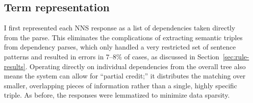 \subsection{Term representation}
\label{sec:response-rep}

I first represented each NNS response as a list of dependencies taken directly from the parse. 
This eliminates the complications of extracting semantic triples from
dependency parses, which only handled a very restricted set of
sentence patterns and resulted in errors in 7--8\% of cases, as discussed in Section~\ref{sec:rule-results}.
Operating directly on individual dependencies from the overall tree also means the system can allow for ``partial credit;'' it distributes the matching over smaller,
overlapping pieces of information rather than a single, highly specific triple. As before, the responses were lemmatized to minimize data sparsity.

